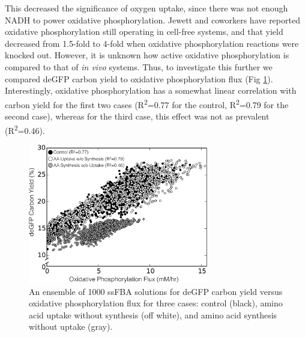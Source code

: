 \documentclass[journal=asbcd6,manuscript=article]{achemso}
\begin{document}
This decreased the significance of oxygen uptake, since there was not enough NADH to power oxidative phosphorylation.
Jewett and coworkers have reported oxidative phosphorylation still operating in cell-free systems, and that yield decreased from 1.5-fold to 4-fold when oxidative phosphorylation reactions were knocked out\cite{Jewett:2008aa}.
However, it is unknown how active oxidative phosphorylation is compared to that of \textit{in vivo} systems.
Thus, to investigate this further we compared deGFP carbon yield to oxidative phosphorylation flux (Fig \ref{fig:oxphos_yield}).
Interestingly, oxidative phosphorylation has a somewhat linear correlation with carbon yield for the first two cases (R\textsuperscript{2}=0.77 for the control, R\textsuperscript{2}=0.79 for the second case), whereas for the third case, this effect was not as prevalent (R\textsuperscript{2}=0.46).
\begin{figure}[t!]
\includegraphics[width=0.7\textwidth]{./Figures/OxPhos_yield.pdf}
\caption{An ensemble of 1000 ssFBA solutions for deGFP carbon yield versus oxidative phosphorylation flux for three cases: control (black), amino acid uptake without synthesis (off white), and amino acid synthesis without uptake (gray).}
\label{fig:oxphos_yield}
\end{figure}
\end{document}

